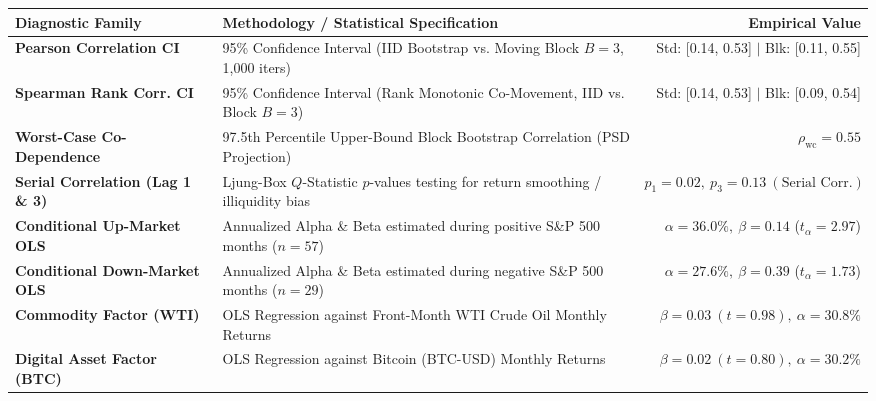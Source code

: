\documentclass[10pt,a4paper]{article}
\begin{document}
\vspace{0.45em}

\begin{tcolorbox}[colback=white, colframe=primary, title=\textbf{\small\strut Appendix A: Extended Statistical, Bootstrap \& Factor Diagnostics}, fonttitle=\sffamily\bfseries\small, arc=5pt, boxrule=0.8pt, toptitle=4pt, bottomtitle=4pt, left=6pt, right=6pt, top=3.5pt, bottom=3.5pt, colbacktitle=primary]
\renewcommand{\arraystretch}{1.22}
\scriptsize
\begin{tabularx}{\textwidth}{l X r}
\toprule
\textbf{\textcolor{primary}{Diagnostic Family}} & \textbf{\textcolor{primary}{Methodology / Statistical Specification}} & \textbf{\textcolor{primary}{Empirical Value}} \\
\midrule
\textbf{Pearson Correlation CI} & 95\% Confidence Interval (IID Bootstrap vs. Moving Block $B=3$, 1,000 iters) & Std: [0.14, 0.53] $\vert$ Blk: [0.11, 0.55] \\
\rowcolor{cardbg} \textbf{Spearman Rank Corr. CI} & 95\% Confidence Interval (Rank Monotonic Co-Movement, IID vs. Block $B=3$) & Std: [0.14, 0.53] $\vert$ Blk: [0.09, 0.54] \\
\textbf{Worst-Case Co-Dependence} & 97.5th Percentile Upper-Bound Block Bootstrap Correlation (PSD Projection) & $\rho_{\text{wc}} = 0.55$ \\
\rowcolor{cardbg} \textbf{Serial Correlation (Lag 1 \& 3)} & Ljung-Box $Q$-Statistic $p$-values testing for return smoothing / illiquidity bias & $p_1=0.02,\ p_3=0.13\ (\text{Serial Corr.})$ \\
\textbf{Conditional Up-Market OLS} & Annualized Alpha \& Beta estimated during positive S\&P 500 months ($n=57$) & $\alpha=36.0\%,\ \beta=0.14$ ($t_\alpha=2.97$) \\
\rowcolor{cardbg} \textbf{Conditional Down-Market OLS} & Annualized Alpha \& Beta estimated during negative S\&P 500 months ($n=29$) & $\alpha=27.6\%,\ \beta=0.39$ ($t_\alpha=1.73$) \\
\textbf{Commodity Factor (WTI)} & OLS Regression against Front-Month WTI Crude Oil Monthly Returns & $\beta=0.03\ (t=0.98),\ \alpha=30.8\%$ \\
\rowcolor{cardbg} \textbf{Digital Asset Factor (BTC)} & OLS Regression against Bitcoin (BTC-USD) Monthly Returns & $\beta=0.02\ (t=0.80),\ \alpha=30.2\%$ \\
\bottomrule
\end{tabularx}
\end{tcolorbox}
\end{document}
